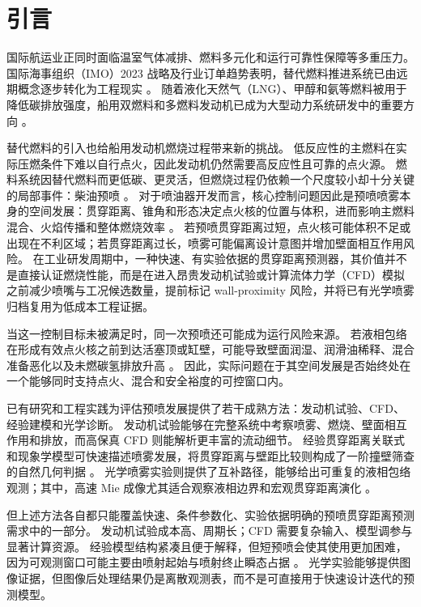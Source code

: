 \section{引言}

国际航运业正同时面临温室气体减排、燃料多元化和运行可靠性保障等多重压力。
国际海事组织（IMO）2023 战略及行业订单趋势表明，替代燃料推进系统已由远期概念逐步转化为工程现实
\cite{imo2023ghgstrategy,classnk2025alternativefuels}。
随着液化天然气（LNG）、甲醇和氨等燃料被用于降低碳排放强度，船用双燃料和多燃料发动机已成为大型动力系统研发中的重要方向
\cite{wingd_lng_faq_2025,wingd_ammonia_faq_2025,classnk_methanol_2024}。

替代燃料的引入也给船用发动机燃烧过程带来新的挑战。
低反应性的主燃料在实际压燃条件下难以自行点火，因此发动机仍然需要高反应性且可靠的点火源。
燃料系统因替代燃料而更低碳、更灵活，但燃烧过程仍依赖一个尺度较小却十分关键的局部事件：柴油预喷
\cite{wingd_xdf_manual_2021,classnk_methanol_2024}。
对于喷油器开发而言，核心控制问题因此是预喷喷雾本身的空间发展：贯穿距离、锥角和形态决定点火核的位置与体积，进而影响主燃料混合、火焰传播和整体燃烧效率
\cite{Karim2015DualFuel,WeiGeng2016DualFuelReview,Sahoo2009DualFuelReview}。
若预喷贯穿距离过短，点火核可能体积不足或出现在不利区域；若贯穿距离过长，喷雾可能偏离设计意图并增加壁面相互作用风险。
在工业研发周期中，一种快速、有实验依据的贯穿距离预测器，其价值并不是直接认证燃烧性能，而是在进入昂贵发动机试验或计算流体力学（CFD）模拟之前减少喷嘴与工况候选数量，提前标记 wall-proximity 风险，并将已有光学喷雾归档复用为低成本工程证据。

当这一控制目标未被满足时，同一次预喷还可能成为运行风险来源。
若液相包络在形成有效点火核之前到达活塞顶或缸壁，可能导致壁面润湿、润滑油稀释、混合准备恶化以及未燃碳氢排放升高
\cite{peraza2022swi,ahmad2025fueldilution,MorieiraMotaPanao2010}。
因此，实际问题在于其空间发展是否始终处在一个能够同时支持点火、混合和安全裕度的可控窗口内。

已有研究和工程实践为评估预喷发展提供了若干成熟方法：发动机试验、CFD、经验建模和光学诊断。
发动机试验能够在完整系统中考察喷雾、燃烧、壁面相互作用和排放，而高保真 CFD 则能解析更丰富的流动细节。
经验贯穿距离关联式和现象学模型可快速描述喷雾发展，将贯穿距离与壁距比较则构成了一阶撞壁筛查的自然几何判据
\cite{HiroyasuArai1990,NaberSiebers1996,Baumgarten2006MixFormation}。
光学喷雾实验则提供了互补路径，能够给出可重复的液相包络观测；其中，高速 Mie 成像尤其适合观察液相边界和宏观贯穿距离演化
\cite{Linne2013SprayImaging}。

但上述方法各自都只能覆盖快速、条件参数化、实验依据明确的预喷贯穿距离预测需求中的一部分。
发动机试验成本高、周期长；CFD 需要复杂输入、模型调参与显著计算资源。
经验模型结构紧凑且便于解释，但短预喷会使其使用更加困难，因为可观测窗口可能主要由喷射起始与喷射终止瞬态占据
\cite{ZhouLiYi2021,ZhouLiLaiWei2019}。
光学实验能够提供图像证据，但图像后处理结果仍是离散观测表，而不是可直接用于快速设计迭代的预测模型。

